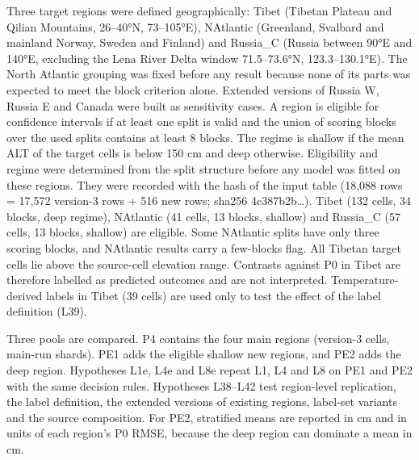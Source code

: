 Three target regions were defined geographically: Tibet (Tibetan Plateau and Qilian Mountains, 26–40°N, 73–105°E), NAtlantic (Greenland, Svalbard and mainland Norway, Sweden and Finland) and Russia\_C (Russia between 90°E and 140°E, excluding the Lena River Delta window 71.5–73.6°N, 123.3–130.1°E). The North Atlantic grouping was fixed before any result because none of its parts was expected to meet the block criterion alone. Extended versions of Russia W, Russia E and Canada were built as sensitivity cases. A region is eligible for confidence intervals if at least one split is valid and the union of scoring blocks over the used splits contains at least 8 blocks. The regime is shallow if the mean ALT of the target cells is below 150 cm and deep otherwise. Eligibility and regime were determined from the split structure before any model was fitted on these regions. They were recorded with the hash of the input table (18,088 rows = 17,572 version-3 rows + 516 new rows; sha256 4c387b2b…). Tibet (132 cells, 34 blocks, deep regime), NAtlantic (41 cells, 13 blocks, shallow) and Russia\_C (57 cells, 13 blocks, shallow) are eligible. Some NAtlantic splits have only three scoring blocks, and NAtlantic results carry a few-blocks flag. All Tibetan target cells lie above the source-cell elevation range. Contrasts against P0 in Tibet are therefore labelled as predicted outcomes and are not interpreted. Temperature-derived labels in Tibet (39 cells) are used only to test the effect of the label definition (L39).

Three pools are compared. P4 contains the four main regions (version-3 cells, main-run shards). PE1 adds the eligible shallow new regions, and PE2 adds the deep region. Hypotheses L1e, L4e and L8e repeat L1, L4 and L8 on PE1 and PE2 with the same decision rules. Hypotheses L38–L42 test region-level replication, the label definition, the extended versions of existing regions, label-set variants and the source composition. For PE2, stratified means are reported in cm and in units of each region's P0 RMSE, because the deep region can dominate a mean in cm.

